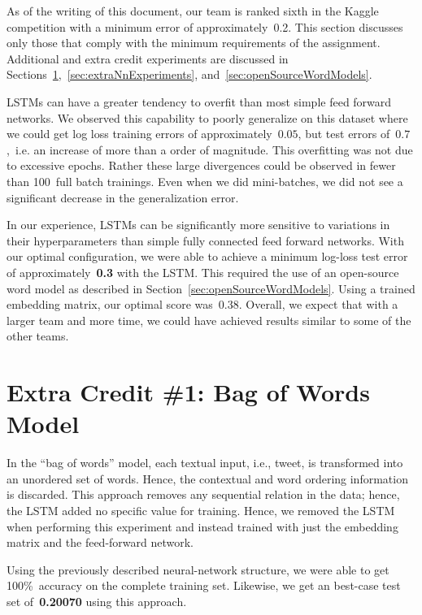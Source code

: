\documentclass{report}
\begin{document}
  As of the writing of this document, our team is ranked sixth in the Kaggle competition with a minimum error of approximately~0.2. This section discusses only those that comply with the minimum requirements of the assignment.  Additional and extra credit experiments are discussed in Sections~\ref{sec:bagOfWords},~\ref{sec:extraNnExperiments}, and~\ref{sec:openSourceWordModels}.
  
  LSTMs can have a greater tendency to overfit than most simple feed forward networks.  We observed this capability to poorly generalize on this dataset where we could get log loss training errors of approximately~$0.05$, but test errors of~$0.7$,~i.e. an increase of more than a order of magnitude.  This overfitting was not due to excessive epochs.  Rather these large divergences could be observed in fewer than 100~full batch trainings.  Even when we did mini-batches, we did not see a significant decrease in the generalization error.
  
  In our experience, LSTMs can be significantly more sensitive to variations in their hyperparameters than simple fully connected feed forward networks.  With our optimal configuration, we were able to achieve a minimum log-loss test error of approximately~\textbf{0.3} with the LSTM.  This required the use of an open-source word model as described in Section~\ref{sec:openSourceWordModels}.  Using a trained embedding matrix, our optimal score was~{0.38}. Overall, we expect that with a larger team and more time, we could have achieved results similar to some of the other teams.
    
  \section{Extra Credit \#1: Bag of Words Model}\label{sec:bagOfWords}
    
  In the ``bag of words'' model, each textual input, i.e., tweet, is transformed into an unordered set of words.  Hence, the contextual and word ordering information is discarded.  This approach removes any sequential relation in the data; hence, the LSTM added no specific value for training.  Hence, we removed the LSTM when performing this experiment and instead trained with just the embedding matrix and the feed-forward network. 
  
  Using the previously described neural-network structure, we were able to get 100\%~accuracy on the complete training set.  Likewise, we get an best-case test set of~\textbf{0.20070} using this approach.
  
\end{document}
